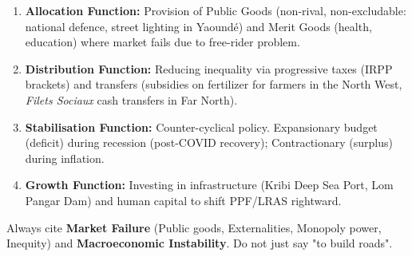 \documentclass[11pt]{article}
\newcommand{\cle}[1]{{\popxbold\color{popdark}#1}}
\begin{document}
\begin{aretenir}
\begin{enumerate}
    \item \textbf{Allocation Function:} Provision of \cle{Public Goods} (non-rival, non-excludable: national defence, street lighting in Yaoundé) and \cle{Merit Goods} (health, education) where market fails due to free-rider problem.
    \item \textbf{Distribution Function:} Reducing inequality via progressive taxes (IRPP brackets) and transfers (subsidies on fertilizer for farmers in the North West, \textit{Filets Sociaux} cash transfers in Far North).
    \item \textbf{Stabilisation Function:} Counter-cyclical policy. Expansionary budget (deficit) during recession (post-COVID recovery); Contractionary (surplus) during inflation.
    \item \textbf{Growth Function:} Investing in infrastructure (Kribi Deep Sea Port, Lom Pangar Dam) and human capital to shift PPF/LRAS rightward.
\end{enumerate}
\end{aretenir}

\begin{attention}
Always cite \textbf{Market Failure} (Public goods, Externalities, Monopoly power, Inequity) and \textbf{Macroeconomic Instability}. Do not just say "to build roads".
\end{attention}
\end{document}
